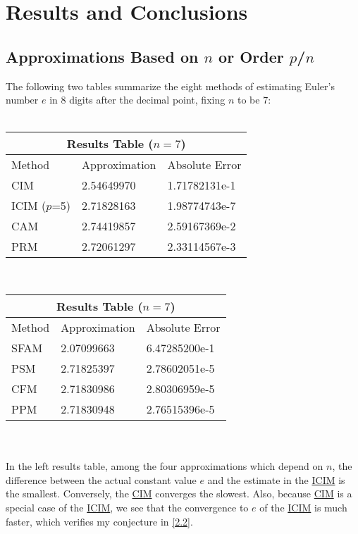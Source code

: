 \documentclass[11pt]{article}
\begin{document}
\section{Results and Conclusions}
\subsection{Approximations Based on $n$ or Order $p$/$n$}\label{3.1}
The following two tables summarize the eight methods of estimating Euler's number $e$ in $8$ digits after the decimal point, fixing $n$ to be $7$:
\\\\ 
\begin{tabular}{ |p{1.95cm}|p{2.4cm}|p{2.78cm}| }
\hline
\multicolumn{3}{|c|}{Results Table ($n=7$)} \\
\hline
Method       & Approximation & Absolute Error \\ 
\hline\hline
CIM          & 2.54649970    & 1.71782131e-1 \\ 
\hline
ICIM ($p$=5) & 2.71828163    & 1.98774743e-7 \\
\hline
CAM          & 2.74419857    & 2.59167369e-2 \\
\hline
PRM          & 2.72061297    & 2.33114567e-3 \\
\hline
\end{tabular}
\,
\begin{tabular}{ |p{1.3cm}|p{2.4cm}|p{2.7cm}| }
\hline
\multicolumn{3}{|c|}{Results Table ($n=7$)} \\
\hline
Method & Approximation & Absolute Error \\ 
\hline\hline
SFAM   & 2.07099663    & 6.47285200e-1 \\
\hline
PSM    & 2.71825397    & 2.78602051e-5 \\
\hline
CFM    & 2.71830986    & 2.80306959e-5 \\
\hline
PPM    & 2.71830948    & 2.76515396e-5 \\
\hline
\end{tabular}
\\\\
In the left results table, among the four approximations which depend on $n$, the difference between the actual constant value $e$ and the estimate in the \hyperref[2.2]{ICIM} is the smallest. Conversely, the \hyperref[2.1]{CIM} converges the slowest. Also, because \hyperref[2.1]{CIM} is a special case of the \hyperref[2.2]{ICIM}, we see that the convergence to $e$ of the \hyperref[2.2]{ICIM} is much faster, which verifies my conjecture in \ref{2.2}.
\end{document}
